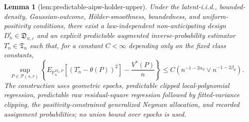 \documentclass{article}
\newtheorem{lemma}{Lemma}
\begin{document}
\begin{lemma}[lem:predictable-aipw-holder-upper]\label{lem:predictable-aipw-holder-upper}
Under the latent-i.i.d., bounded-density, Gaussian-outcome, Hölder-smoothness, boundedness, and uniform-positivity conditions, there exist a law-independent non-anticipating design \(D_n^{\circ}\in\mathfrak D_{n,\varepsilon}\) and an explicit predictable augmented inverse-probability estimator \(T_n^{\circ}\in\mathfrak T_n\) such that, for a constant \(C<\infty\) depending only on the fixed class constants,
\[
\sup_{P\in\mathcal P(s,r)}
\left\{
E_{\mathbb P_n^{D_n^{\circ},P}}[(T_n^{\circ}-\theta(P))^2]
-\frac{V^*(P)}{n}
\right\}
\leq C\left(n^{-1-2\alpha_d}\vee n^{-1-2\beta_d}\right).
\]
The construction uses geometric epochs, predictable clipped local-polynomial regression, predictable raw residual-square regression followed by fitted-variance clipping, the positivity-constrained generalized Neyman allocation, and recorded assignment probabilities; no union bound over epochs is used.
\end{lemma}
\end{document}
